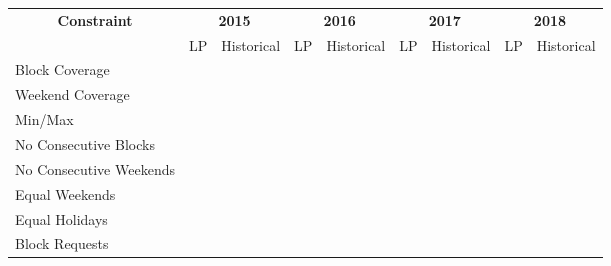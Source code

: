 \begin{table}[h]
	\centering
    \begin{tabular}{l|cc|cc|cc|cc}
    	\hline
    	\multicolumn{1}{c|}{\multirow{2}[1]{*}{\textbf{Constraint}}} & \multicolumn{2}{c|}{\textbf{2015}} & \multicolumn{2}{c|}{\textbf{2016}} & \multicolumn{2}{c|}{\textbf{2017}} & \multicolumn{2}{c}{\textbf{2018}} \\
    	                                                             &     LP     &      Historical       &     LP     &      Historical       &     LP     &      Historical       &     LP     &      Historical      \\ \midrule
    	Block Coverage                                               & \checkmark &      \checkmark       & \checkmark &      \checkmark       & \checkmark &      \checkmark       & \checkmark &      \checkmark      \\
    	Weekend Coverage                                             & \checkmark &      \checkmark       & \checkmark &      \checkmark       & \checkmark &      \checkmark       & \checkmark &      \checkmark      \\
    	Min/Max                                                      & \checkmark &      \checkmark       & \checkmark &      \checkmark       & \checkmark &      \checkmark       & \checkmark &      \checkmark      \\
    	No Consecutive Blocks                                        & \checkmark &                       & \checkmark &                       & \checkmark &                       & \checkmark &                      \\
    	No Consecutive Weekends                                      & \checkmark &                       & \checkmark &                       & \checkmark &      \checkmark       & \checkmark &      \checkmark      \\
    	Equal Weekends                                               & \checkmark &                       & \checkmark &                       & \checkmark &                       & \checkmark &                      \\
    	Equal Holidays                                               & \checkmark &                       & \checkmark &                       & \checkmark &                       & \checkmark &                      \\ \hline
    	Block Requests                                               &            &                       &            &                       &            &                       &            &                      \\

\end{tabular}
\end{table}
